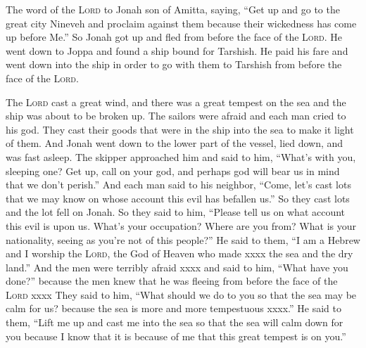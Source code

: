 
\begin{inparaenum}
     The word of the \textsc{Lord} to Jonah son of Amitta, saying,%
     ``Get up and go to the great city Nineveh and proclaim against them because their wickedness has come up before Me.''%
     So Jonah got up  and fled from before the face of the \textsc{Lord}. He went down to Joppa and found a ship bound for Tarshish. He paid his fare and went down into the ship in order to go with them to Tarshish from before the face of the \textsc{Lord}.%
    
     The \textsc{Lord} cast a great wind, and there was a great tempest on the sea and the ship was about to be broken up.%
     The sailors were afraid and each man cried to his god. They cast their goods that were in the ship into the sea to make it light of them. And Jonah went down to the lower part of the vessel, lied down, and was fast asleep.%
     The skipper approached him and said to him, ``What's with you, sleeping one? Get up, call on your god, and perhaps god will bear us in mind that we don't perish.''%
     And each man said to his neighbor, ``Come, let's cast lots that we may know on whose account this evil has befallen us.'' So they cast lots and the lot fell on Jonah.%
     So they said to him, ``Please tell us on what account this evil is upon us. What's your occupation? Where are you from? What is your nationality, seeing as you're not of this people?''%
     He said to them, ``I am a Hebrew and I worship the \textsc{Lord}, the God of Heaven who made xxxx the sea and the dry land.''%
     And the men were terribly afraid xxxx and said to him, ``What have you done?'' because the men knew that he was fleeing from before the face of the \textsc{Lord} xxxx%
     They said to him, ``What should we do to you so that the sea may be calm for us? because the sea is more and more tempestuous xxxx.''%
     He said to them, ``Lift me up and cast me into the sea so that the sea will calm down for you because I know that it is because of me that this great tempest is on you.''%

\end{inparaenum}
